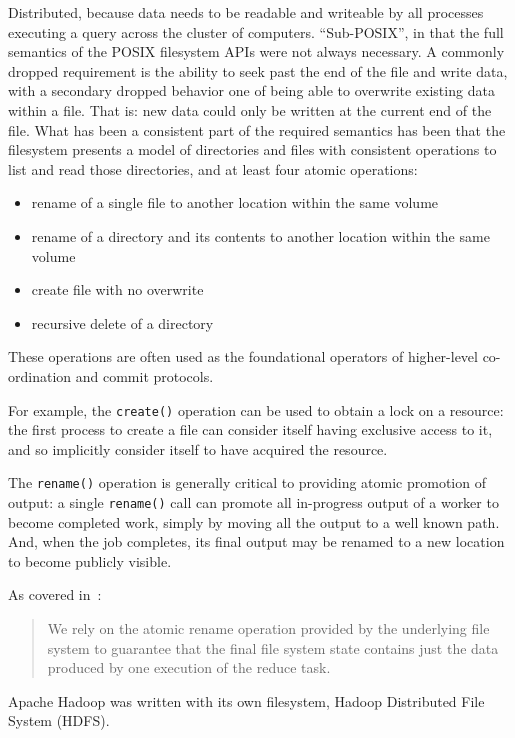 \documentclass[conference]{IEEEtran}
\begin{document}
Distributed, because data needs to be readable and writeable by all processes
executing a query across the cluster of computers.
``Sub-POSIX'', in that the full semantics of the POSIX filesystem APIs were not always necessary.
A commonly dropped requirement is the ability to seek past the end of the file and
write data, with a secondary dropped behavior one of being able to overwrite existing
data within a file.
That is: new data could only be written at the current end of the file.
What has been a consistent part of the required semantics has been that the filesystem
presents a model of directories and files with consistent operations to list and
read those directories, and at least four atomic operations:

\begin{itemize}
  \item rename of a single file to another location within the same volume 
  \item rename of a directory and its contents to another location within the same volume 
  \item create file with no overwrite 
  \item recursive delete of a directory 
\end{itemize}

These operations are often used as the foundational operators of higher-level
co-ordination and commit protocols.

For example, the \texttt{create()} operation can be used to obtain a lock on a resource:
the first process to create a file can consider itself having exclusive access to it,
and so implicitly consider itself to have acquired the resource.

The \texttt{rename()} operation is generally critical to providing atomic promotion
of output: a single \texttt{rename()} call can promote all in-progress output
of a worker to become completed work, simply by moving all the output to a well known path.
And, when the job completes, its final output may be renamed to a new location to become
publicly visible.

As covered in\ \cite{Dean_2004_MSD_1251254_1251264}:

\begin{quote}
We rely on the atomic rename operation provided by the underlying file system
to guarantee that the final file system state contains just the data produced
by one execution of the reduce task.
\end{quote}


Apache Hadoop was written with its own filesystem, Hadoop Distributed File System (HDFS).
\end{document}
